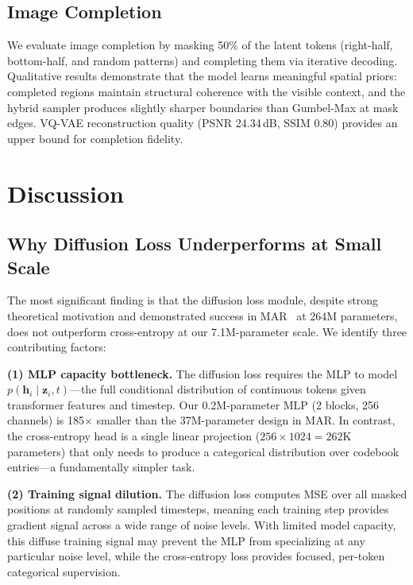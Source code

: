 \documentclass[conference]{IEEEtran}
\begin{document}
\subsection{Image Completion}

We evaluate image completion by masking 50\% of the latent tokens (right-half, bottom-half, and random patterns) and completing them via iterative decoding. Qualitative results demonstrate that the model learns meaningful spatial priors: completed regions maintain structural coherence with the visible context, and the hybrid sampler produces slightly sharper boundaries than Gumbel-Max at mask edges. VQ-VAE reconstruction quality (PSNR 24.34\,dB, SSIM 0.80) provides an upper bound for completion fidelity.


\section{Discussion}
\label{sec:discussion}

\subsection{Why Diffusion Loss Underperforms at Small Scale}

The most significant finding is that the diffusion loss module, despite strong theoretical motivation and demonstrated success in MAR~\cite{li2024mar} at 264M parameters, does not outperform cross-entropy at our 7.1M-parameter scale. We identify three contributing factors:

\textbf{(1) MLP capacity bottleneck.} The diffusion loss requires the MLP to model $p(\mathbf{h}_i \mid \mathbf{z}_i, t)$---the full conditional distribution of continuous tokens given transformer features and timestep. Our 0.2M-parameter MLP (2 blocks, 256 channels) is 185$\times$ smaller than the 37M-parameter design in MAR. In contrast, the cross-entropy head is a single linear projection ($256 \times 1024 = 262$K parameters) that only needs to produce a categorical distribution over codebook entries---a fundamentally simpler task.

\textbf{(2) Training signal dilution.} The diffusion loss computes MSE over all masked positions at randomly sampled timesteps, meaning each training step provides gradient signal across a wide range of noise levels. With limited model capacity, this diffuse training signal may prevent the MLP from specializing at any particular noise level, while the cross-entropy loss provides focused, per-token categorical supervision.
\end{document}

